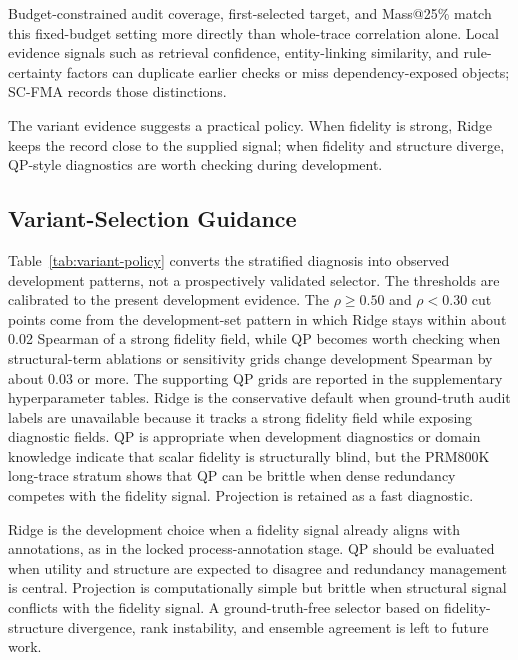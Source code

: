 \documentclass[a4paper,fleqn]{cas-sc}
\begin{document}
Budget-constrained audit coverage, first-selected target, and Mass@25\% match this fixed-budget setting more directly than whole-trace correlation alone. Local evidence signals such as retrieval confidence, entity-linking similarity, and rule-certainty factors can duplicate earlier checks or miss dependency-exposed objects; SC-FMA records those distinctions.

The variant evidence suggests a practical policy. When fidelity is strong, Ridge keeps the record close to the supplied signal; when fidelity and structure diverge, QP-style diagnostics are worth checking during development.

\subsection{Variant-Selection Guidance}

Table~\ref{tab:variant-policy} converts the stratified diagnosis into observed development patterns, not a prospectively validated selector. The thresholds are calibrated to the present development evidence. The $\rho \ge 0.50$ and $\rho < 0.30$ cut points come from the development-set pattern in which Ridge stays within about 0.02 Spearman of a strong fidelity field, while QP becomes worth checking when structural-term ablations or sensitivity grids change development Spearman by about 0.03 or more. The supporting QP grids are reported in the supplementary hyperparameter tables. Ridge is the conservative default when ground-truth audit labels are unavailable because it tracks a strong fidelity field while exposing diagnostic fields. QP is appropriate when development diagnostics or domain knowledge indicate that scalar fidelity is structurally blind, but the PRM800K long-trace stratum shows that QP can be brittle when dense redundancy competes with the fidelity signal. Projection is retained as a fast diagnostic.

Ridge is the development choice when a fidelity signal already aligns with annotations, as in the locked process-annotation stage. QP should be evaluated when utility and structure are expected to disagree and redundancy management is central. Projection is computationally simple but brittle when structural signal conflicts with the fidelity signal. A ground-truth-free selector based on fidelity-structure divergence, rank instability, and ensemble agreement is left to future work.
\end{document}
